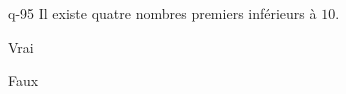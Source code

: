 \begin{truefalse}{q-95}
Il existe quatre nombres premiers inférieurs à $10$.
\item* Vrai
\item Faux
\end{truefalse}

